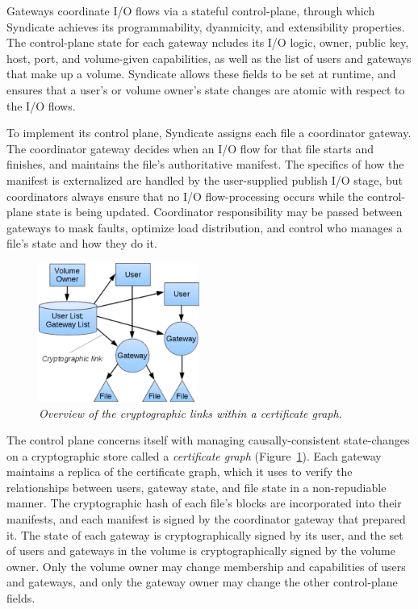 Gateways coordinate I/O flows via a stateful control-plane, through which
Syndicate achieves its programmability, dyanmicity, and extensibility
properties. The control-plane state for each gateway ncludes its I/O logic,
owner, public key, host, port, and volume-given capabilities, as well as the
list of users and gateways that make up a volume. Syndicate allows these fields
to be set at runtime, and ensures that a user's or volume owner's state
changes are atomic with respect to the I/O flows.

To implement its control plane, Syndicate assigns each file a coordinator
gateway. The coordinator gateway decides when an I/O flow for that file starts
and finishes, and maintains the file's authoritative manifest. The specifics
of how the manifest is externalized are handled by the user-supplied publish I/O
stage, but coordinators always ensure that no I/O flow-processing occurs while
the control-plane state is being updated. Coordinator responsibility may be
passed between gateways to mask faults, optimize load distribution, and control
who manages a file's state and how they do it.


\begin{figure}[t!]
\centering
\includegraphics[width=0.47\textwidth]{figures/cert-graph}
\caption{\it
Overview of the cryptographic links within a certificate graph.
   }
\label{fig:cert-graph}
\end{figure}


The control plane concerns itself with managing causally-consistent
state-changes on a cryptographic store called a \textit{certificate graph}
(Figure~\ref{fig:cert-graph}). Each gateway
maintains a replica of the certificate graph, which it uses to verify the
relationships between users, gateway state, and file state in a non-repudiable
manner. The cryptographic hash of each file's blocks are incorporated into
their manifests, and each manifest is signed by the coordinator gateway that
prepared it. The state of each gateway is cryptographically signed by its user,
and the set of users and gateways in the volume is cryptographically signed by
the volume owner. Only the volume owner may change membership and capabilities
of users and gateways, and only the gateway owner may change the other
control-plane fields.


